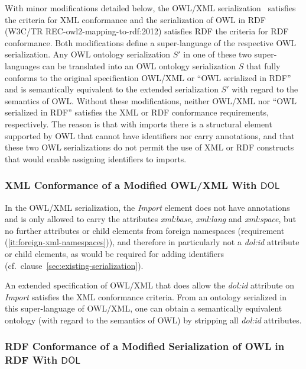 \documentclass[10pt,fleqn,final]{scrreprt}
\makeatletter
\newcommand*\CommentAuthor{}
\renewcommand*\CommentAuthor{#1}}
\newcommand*\CommentDate{}
\renewcommand*\CommentDate{#1}}
\newcommand*\CommentId{}
\renewcommand*\CommentId{#1}}
\newcommand*\CommentType{}
\renewcommand*\CommentType{#1}}
\newcommand*{\SetCommentColorByType}[1]{%
\edef\localType{{#1}}%
\expandafter\ifstrequal\localType{q-aut}{\colorlet{CommentColor}{red}}{%
\expandafter\ifstrequal\localType{q-all}{\colorlet{CommentColor}{orange}}{%
\expandafter\ifstrequal\localType{todo}{\colorlet{CommentColor}{orange}}{%
\expandafter\ifstrequal\localType{fyi}{\colorlet{CommentColor}{lightgray}}{%
\colorlet{CommentColor}{yellow}}}}}}
\newcommand*{\SetCommentPrefixByType}[1]{%
\edef\localType{{#1}}%
\expandafter\@ifmtarg\localType{%
\edef\CommentPrefix{}%
}{%
\caseupper[q]{#1}%
\edef\CommentPrefix{\thestring: }%
}}
\newcommand*{\initComment}[1]{%
\setkeys{Comment}{#1}%
\SetCommentColorByType{\CommentType}%
\relax%
\SetCommentPrefixByType{\CommentType}%
\relax%
}
\newcommand*{\todonote}[2][]{%
\initComment{#1}%
\pdfcomment[author=\CommentAuthor,color=CommentColor,date=\CommentDate,id=\CommentId]{%
\CommentPrefix
#2}}
\renewcommand*{\todonote}[2][]{%
\initComment{#1}%
\ednote{\CommentPrefix #2}}
\newcommand*{\CLnote}[2][author=Christoph Lange]{%
\todonote[author=Christoph Lange,#1]{#2} 
}
\newcommand*{\DOL}{\ensuremath{\mathsf{DOL}}\xspace}
\newcommand{\nisref}[1]{#1}
\newenvironment{definitions}[0]{\medskip }{}
\makeatother
\begin{document}
\begin{definitions}
With minor modifications detailed below, the OWL/XML serialization~\cite{W3C:REC-owl2-xml-serialization-20121211} satisfies the criteria for XML conformance and the serialization of OWL in RDF (\nisref{W3C/TR REC-owl2-mapping-to-rdf:2012}) satisfies RDF the criteria for RDF conformance. %
Both modifications define a super-language of the respective OWL serialization.
Any OWL ontology serialization $S'$ in one of these two super-languages can be translated into an OWL ontology serialization $S$ that fully conforms to the original specification OWL/XML or ``OWL serialized in RDF'' and is semantically equivalent to the extended serialization $S'$ with regard to the semantics of OWL.
Without these modifications, neither OWL/XML nor ``OWL serialized in RDF'' satisfies the XML or RDF conformance requirements, respectively.
The reason is that with imports there is a structural element supported by OWL that cannot have identifiers nor carry annotations, and that these two OWL serializations do not permit the use of XML or RDF constructs that would enable assigning identifiers to imports.

\subsubsection{XML Conformance of a Modified OWL/XML With \DOL}\label{sec:xml-conf-modif}

In the OWL/XML serialization, the \textit{Import} element does not have annotations and is only allowed to carry the attributes \textit{xml:base}, \textit{xml:lang} and \textit{xml:space}, but no further attributes or child elements from foreign namespaces (requirement (\ref{it:foreign-xml-namespaces})), and therefore in particularly not a \textit{dol:id} attribute or child elements, as would be required for adding identifiers (cf.\ clause~\ref{sec:existing-serialization}).

An extended specification of OWL/XML that does allow the \textit{dol:id} attribute on \textit{Import} satisfies the XML conformance criteria.
From an ontology serialized in this super-language of OWL/XML, one can obtain a semantically equivalent ontology (with regard to the semantics of OWL) by stripping all \textit{dol:id} attributes.

\subsubsection{RDF Conformance of a Modified Serialization of OWL in RDF With \DOL}


\end{definitions}
\end{document}
